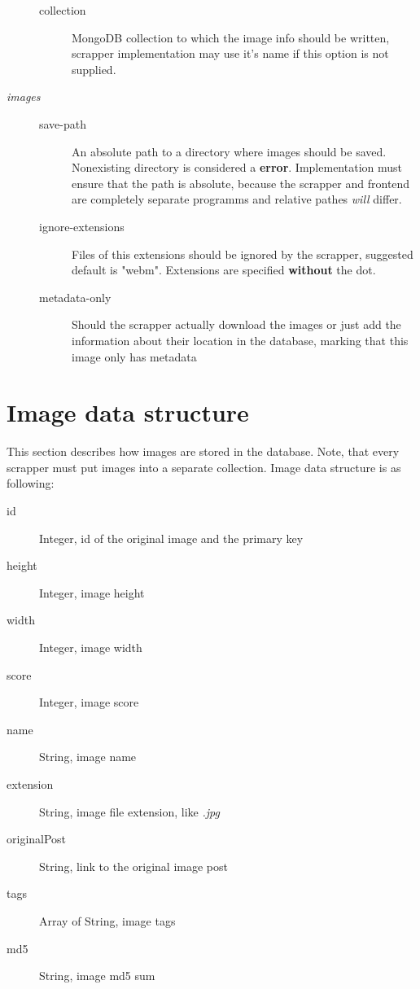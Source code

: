 \documentclass{article}
\begin{document}
\begin{description}
\begin{description}
  \item [collection] MongoDB collection to which the image info should be written, scrapper
    implementation may use it's name if this option is not supplied.
  \end{description}

\item [\textit{images}] \hfill
  \begin{description}
  \item [save-path] An absolute path to a directory where images should be saved.
    Nonexisting directory is considered a \textbf{error}.
    Implementation must ensure that the path is absolute, because the scrapper
    and frontend are completely separate programms and relative pathes \textit{will} differ.
  \item [ignore-extensions] Files of this extensions should be ignored by the scrapper,
    suggested default is "webm". Extensions are specified \textbf{without} the dot.
  \item [metadata-only] Should the scrapper actually download the images or
    just add the information about their location in the database, marking that
    this image only has metadata
  \end{description}

\end{description}

\pagebreak

\section{Image data structure}

This section describes how images are stored in the database. Note, that every scrapper must
put images into a separate collection. Image data structure is as following:

\begin{description}
\item [id] Integer, id of the original image and the primary key
\item [height] Integer, image height
\item [width] Integer, image width
\item [score] Integer, image score
\item [name] String, image name
\item [extension] String, image file extension, like \textit{.jpg}
\item [originalPost] String, link to the original image post
\item [tags] Array of String, image tags
\item [md5] String, image md5 sum
\end{description}
\end{document}
